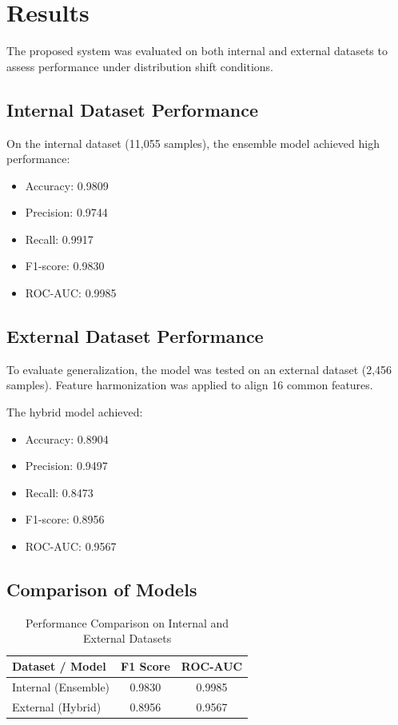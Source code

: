 ﻿\documentclass[conference]{IEEEtran}
\begin{document}
\section{Results}
The proposed system was evaluated on both internal and external datasets to assess performance under distribution shift conditions.

\subsection{Internal Dataset Performance}
On the internal dataset (11,055 samples), the ensemble model achieved high performance:

\begin{itemize}
\item Accuracy: 0.9809
\item Precision: 0.9744
\item Recall: 0.9917
\item F1-score: 0.9830
\item ROC-AUC: 0.9985
\end{itemize}

\subsection{External Dataset Performance}
To evaluate generalization, the model was tested on an external dataset (2,456 samples). Feature harmonization was applied to align 16 common features.

The hybrid model achieved:

\begin{itemize}
\item Accuracy: 0.8904
\item Precision: 0.9497
\item Recall: 0.8473
\item F1-score: 0.8956
\item ROC-AUC: 0.9567
\end{itemize}

\subsection{Comparison of Models}
\begin{table}[htbp]
\centering
\small
\caption{Performance Comparison on Internal and External Datasets}
\begin{tabular}{|l|c|c|}
\hline
\textbf{Dataset / Model} & \textbf{F1 Score} & \textbf{ROC-AUC} \\
\hline
Internal (Ensemble) & 0.9830 & 0.9985 \\
External (Hybrid) & 0.8956 & 0.9567 \\
\hline
\end{tabular}
\end{table}
\end{document}
